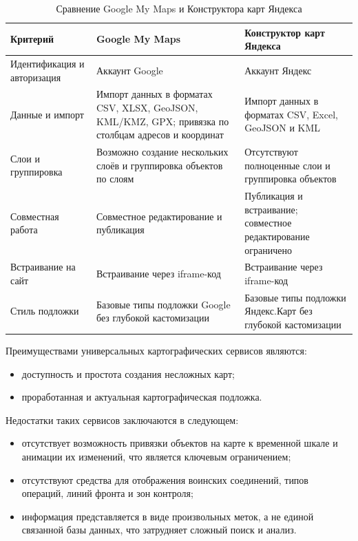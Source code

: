 \begin{table}[H]
\caption{\label{tab:map-services}Сравнение Google My Maps и Конструктора карт Яндекса}
\centering
{\footnotesize
\begin{tabular}{|p{3.0cm}|p{6.3cm}|p{5.7cm}|}
\hline
\textbf{Критерий} & \textbf{Google My Maps} & \textbf{Конструктор карт Яндекса} \\ \hline
Идентификация и авторизация & Аккаунт Google & Аккаунт Яндекс \\ \hline
Данные и импорт & Импорт данных в форматах CSV, XLSX, GeoJSON, KML/KMZ, GPX; привязка по столбцам адресов и координат & Импорт данных в форматах CSV, Excel, GeoJSON и KML \\ \hline
Слои и группировка & Возможно создание нескольких слоёв и группировка объектов по слоям & Отсутствуют полноценные слои и группировка объектов \\ \hline
Совместная работа & Совместное редактирование и публикация & Публикация и встраивание; совместное редактирование ограничено \\ \hline
Встраивание на сайт & Встраивание через iframe-код & Встраивание через iframe-код \\ \hline
Стиль подложки & Базовые типы подложки Google без глубокой кастомизации & Базовые типы подложки Яндекс.Карт без глубокой кастомизации \\ \hline
\end{tabular}}
\end{table}

Преимуществами универсальных картографических сервисов являются:
\begin{itemize}
\item доступность и простота создания несложных карт;
\item проработанная и актуальная картографическая подложка.
\end{itemize}

Недостатки таких сервисов заключаются в следующем:
\begin{itemize}
\item отсутствует возможность привязки объектов на карте к временной шкале и анимации их изменений, что является ключевым ограничением;
\item отсутствуют средства для отображения воинских соединений, типов операций, линий фронта и зон контроля;
\item информация представляется в виде произвольных меток, а не единой связанной базы данных, что затрудняет сложный поиск и анализ.
\end{itemize}

